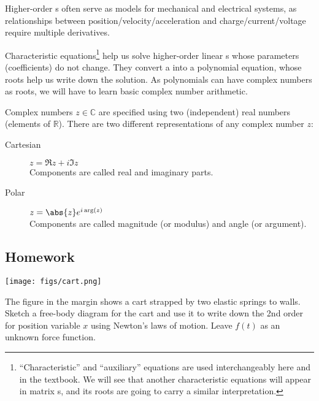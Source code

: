\begin{weekintro}
  Higher-order \ode{}s often serve as models for mechanical and electrical systems, as relationships between position/velocity/acceleration and charge/current/voltage require multiple derivatives.

  Characteristic equations\footnote{``Characteristic'' and ``auxiliary'' equations are used interchangeably here and in the textbook. We will see that another characteristic equations will appear in matrix \ode{}s, and its roots are going to carry a similar interpretation.} help us solve higher-order linear \ode{}s whose parameters (coefficients) do not change. They convert a \ode{} into a polynomial equation, whose roots help us write down the solution. As polynomials can have complex numbers as roots, we will have to learn basic complex number arithmetic.

  Complex numbers \(z \in \mathbb{C}\) are specified using two (independent) real numbers (elements of \(\mathbb{R}\)). There are two different representations of any complex number \(z\):
  \begin{description}
  \item[Cartesian] \(z = \Re z + i \Im z\) \\
    Components are called real and imaginary parts. 
  \item[Polar] \(z = \abs{z} e^{i \arg(z)}\) \\
    Components are called magnitude (or modulus) and angle (or argument). 
  \end{description}
\end{weekintro}

\subsection*{Homework}
\begin{marginfigure}\centering
  \texttt{[image: figs/cart.png]}
\end{marginfigure}
\begin{question}
  The figure in the margin shows a cart strapped by two elastic springs to walls. Sketch a free-body diagram for the cart and use it to write down the 2nd order \ode{} for position variable \(x\) using Newton's laws of motion. Leave \(f(t)\) as an unknown force function.
  \solspace{3in}
\end{question}

